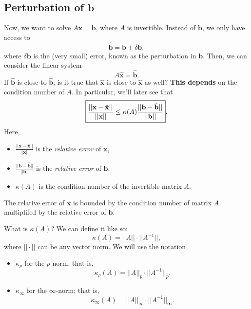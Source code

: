 \documentclass[letterpaper]{article}
\newcommand{\0}{\mathbf{0}}
\renewcommand{\b}{\mathbf{b}}
\newcommand{\x}{\mathbf{x}}
\begin{document}
\subsection{Perturbation of \texorpdfstring{$\b$}{b}}
Now, we want to solve $A\x = \b$, where $A$ is invertible. Instead of $\b$, we only have access to \[\hat{\b} = \b + \delta\b,\] where $\delta\b$ is the (very small) error, known as the perturbation in $\b$. Then, we can consider the linear system \[A\hat{\x} = \hat{\b}.\] If $\hat{\b}$ is close to $\hat{\b}$, is it true that $\hat{\x}$ is close to $\hat{\x}$ as well? \textbf{This depends} on the condition number of $A$. In particular, we'll later see that \begin{equation}{\label{2-13:1}}
    \boxed{\frac{||\x - \hat{\x}||}{||\x||} \leq \kappa(A) \frac{||\b - \hat{\b}||}{||\b||}}.
\end{equation} Here, 
\begin{itemize}
    \item $\frac{||\x - \hat{\x}||}{||\x||}$ is the \emph{relative error} of $\x$, 
    \item $\frac{||\b - \hat{\b}||}{||\b||}$ is the \emph{relative error} of $\b$. 
    \item $\kappa(A)$ is the condition number of the invertible matrix $A$.
\end{itemize}
The relative error of $\x$ is bounded by the condition number of matrix $A$ multiplifed by the relative error of $\b$. 

\bigskip 

What is $\kappa(A)$? We can define it like so:  
\[\kappa(A) = ||A|| \cdot ||A^{-1}||,\] where $||\cdot||$ can be any vector norm. We will use the notation 
\begin{itemize}
    \item $\kappa_p$ for the $p$-norm; that is, \[\kappa_{p}(A) = ||A||_p \cdot ||A^{-1}||_p.\]
    \item $\kappa_\infty$ for the $\infty$-norm; that is, \[\kappa_\infty(A) = ||A||_\infty \cdot ||A^{-1}||_\infty.\]
\end{itemize}
\end{document}
